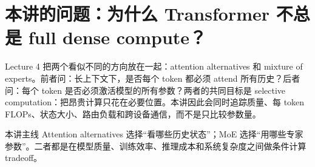 \section{本讲的问题：为什么 Transformer 不总是 full dense compute？}
Lecture 4 把两个看似不同的方向放在一起：attention alternatives 和 mixture of experts。前者问：长上下文下，是否每个 token 都必须 attend 所有历史？后者问：每个 token 是否必须激活模型的所有参数？两者的共同目标是 selective computation：把昂贵计算只花在必要位置。本讲因此会同时追踪质量、每 token FLOPs、状态大小、路由负载和跨设备通信，而不是只比较参数量。
\begin{importantbox}{本讲主线}
Attention alternatives 选择“看哪些历史状态”；MoE 选择“用哪些专家参数”。二者都是在模型质量、训练效率、推理成本和系统复杂度之间做条件计算 tradeoff。
\end{importantbox}
